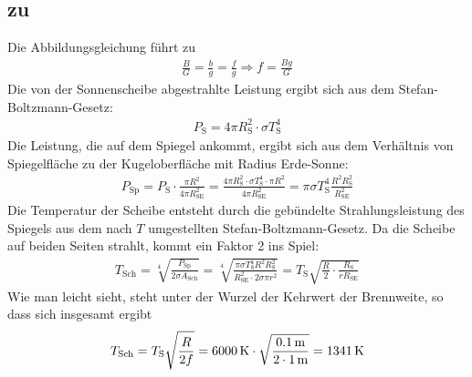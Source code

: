 \documentclass[a4paper]{scrartcl}
\begin{document}
\subsection{zu }
\label{lsg:SchwarzeSonne}
Die Abbildungsgleichung führt zu
\begin{align*}
  \frac{B}{G} = \frac{b}{g} = \frac{f}{g} \Rightarrow f = \frac{Bg}{G}
\end{align*}
Die von der Sonnenscheibe abgestrahlte Leistung ergibt sich aus dem Stefan-Boltzmann-Gesetz:
\begin{align*}
  P_\text{S} = 4\pi R_\text{S}^2 \cdot \sigma T_\text{S}^4
\end{align*}
Die Leistung, die auf dem Spiegel ankommt, ergibt sich aus dem Verhältnis von Spiegelfläche zu der Kugeloberfläche mit Radius Erde-Sonne:
\begin{align*}
  P_\text{Sp} = P_\text{S} \cdot \frac{\pi R^2}{4\pi R_\text{SE}^2} = \frac{4\pi R_\text{S}^2 \cdot \sigma T_\text{S}^4 \cdot \pi R^2}{4\pi R_\text{SE}^2} = \pi \sigma T_\text{S}^4 \frac{R^2 R_\text{S}^2}{R_\text{SE}^2}
\end{align*}
  Die Temperatur der Scheibe entsteht durch die gebündelte Strahlungsleistung des Spiegels aus dem nach $T$ umgestellten Stefan-Boltzmann-Gesetz. Da die Scheibe auf beiden Seiten strahlt, kommt ein Faktor 2 ins Spiel:
  \begin{align*}
    T_\text{Sch} = \sqrt[4]{\frac{P_\text{Sp}}{2 \sigma A_\text{Sch}}} = \sqrt[4]{\frac{\pi \sigma T_\text{S}^4 R^2 R_\text{S}^2}{R_\text{SE}^2 \cdot 2 \sigma \pi r^2}} = T_\text{S} \sqrt{\frac{R}{2} \cdot \frac{R_\text{S}}{r R_\text{SE}}}
  \end{align*}
  Wie man leicht sieht, steht unter der Wurzel der Kehrwert der Brennweite, so dass sich insgesamt ergibt
  \begin{align*}
    T_\text{Sch} = T_\text{S} \sqrt{\frac{R}{2f}} = \unit[6000]{K} \cdot \sqrt{\frac{ \unit[0.1]{m}}{2 \cdot \unit[1]{m}}} = \unit[1341]{K}
  \end{align*}
\end{document}
